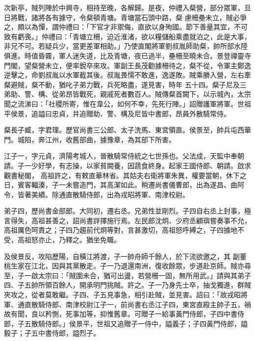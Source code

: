 \begin{pinyinscope}
 次新亭，賊列陣於中興寺，相持至晚，各解歸。是夜，仲禮入粲營，部分眾軍，旦日將戰，諸將各有據守，令粲頓青塘。青塘當石頭中路，粲
 慮柵壘未立，賊必爭之，頗以為憚，謂仲禮曰：「下官才非禦侮，直欲以身殉國。節下善量其宜，不可致有虧喪。」仲禮曰：「青塘立柵，迫近淮渚，欲以糧儲船乘盡就泊之，此是大事，非兄不可。若疑兵少，當更差軍相助。」乃使直閣將軍劉叔胤師助粲，帥所部水陸俱進。時值昏霧，軍人迷失道，比及青塘，夜已過半，壘柵至曉未合。景登禪靈寺門閣，望粲營未立，便率銳卒來攻。軍副王長茂勸據柵待之，粲不從，令軍主鄭逸逆擊之，命劉叔胤以水軍截其後。叔胤畏懦不敢進，逸遂敗。賊乘勝入營，左右牽粲避賊，粲不動，猶叱子弟力戰，兵死略盡，遂見害，時年
 五十四。粲子尼及三弟助、警、構、從弟昂皆戰死，親戚死者數百人。賊傳粲首闕下，以示城內，太宗聞之流涕曰：「社稷所寄，惟在韋公，如何不幸，先死行陣。」詔贈護軍將軍。世祖平侯景，追謚曰忠貞，并追贈助、警、構及尼皆中書郎，昂員外散騎常侍。



 粲長子臧，字君理。歷官尚書三公郎、太子洗馬、東宮領直。侯景至，帥兵屯西華門。城陷，奔江州，收舊部曲，據豫章，為其部下所害。



 江子一，字元貞，濟陽考城人，晉散騎常侍統之七世孫也。父法成，天監中奉朝請。子一少好學，有志操，以家貧闕養，因蔬食終身。起家王國侍郎、朝請。啟求觀書秘閣，
 高祖許之，有敕直華林省。其姑夫右衛將軍朱異，權要當朝，休下之日，賓客輻湊，子一未嘗造門，其高潔如此。稍遷尚書儀曹郎，出為遂昌、曲阿令，皆著美績。除通直散騎侍郎，出為戎昭將軍、南津校尉。



 弟子四，歷尚書金部郎。大同初，遷右丞。兄弟性並剛烈。子四自右丞上封事，極言得失，高祖甚善之，詔尚書詳擇施行焉。左民郎沈炯、少府丞顧璵嘗奏事不允，高祖厲色呵責之；子四乃趨前代炯等對，言甚激切，高祖怒呼縛之，子四據地不受，高祖怒亦止，乃釋之。猶坐免職。



 及侯景反，攻陷歷陽，自橫江將渡，子一帥舟師千餘人，於下流欲邀之，其
 副董桃生家在江北，因與其黨散走。子一乃退還南洲，復收餘眾，步道赴京師。賊亦尋至，子一啟太宗曰：「賊圍未合，猶可出盪，若營柵一固，無所用武。」請與其弟子四、子五帥所領百餘人，開承明門挑賊。許之。子一乃身先士卒，抽戈獨進，群賊夾攻之，從者莫敢繼。子四、子五見事急，相引赴賊，並見害。詔曰：「故戎昭將軍、通直散騎侍郎、南津校尉江子一，前尚書右丞江子四，東宮直殿主帥子五，禍故有聞，良以矜惻，死事加等，抑惟舊章。可贈子一給事黃門侍郎，子四中書侍郎，子五散騎侍郎。」侯景平，世祖又追贈子一侍中，謚義子；子四黃門侍郎，謚
 毅子；子五中書侍郎，謚烈子。




\end{pinyinscope}

